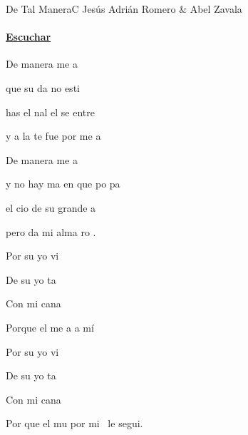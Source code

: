 \documentclass[12pt, spanish]{book}
\begin{document}
    \begin{song}{De Tal Manera}{C}
        {} %
        {Jesús Adrián Romero \& Abel Zavala}
        {} %
        {}
        \ifChordBk
        \paragraph{\mbox{}\hfill\protect\href{https://open.spotify.com/intl-es/track/16U7geOUCbpaVmQ9ILpyfa}{Escuchar}\mbox{}\hfill}
        \fi

        \begin{SBOpGroup}
            De  manera me a

            que su da no esti

            has el nal el se entre

            y a la te fue por me a
        \end{SBOpGroup}

        \begin{SBOpGroup}
            De  manera me a

            y no hay ma en que po pa

            el cio de su grande a

            pero da mi alma ro .
        \end{SBOpGroup}

        \begin{SBChorus}
            Por su  yo vi

            De su  yo ta

            Con mi  cana

            Porque el me a a mí

            Por su  yo vi

            De su  yo ta

            Con mi  cana

            Por que el mu por mi~ le segui.
        \end{SBChorus}


\end{song}
\end{document}
